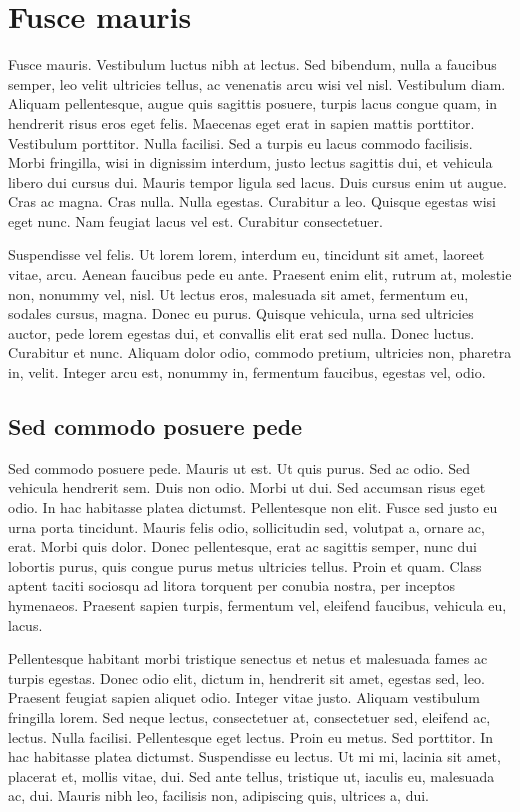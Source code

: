 \section{Fusce mauris}

Fusce mauris. Vestibulum luctus nibh at lectus. Sed bibendum, nulla a
faucibus semper, leo velit ultricies tellus, ac venenatis arcu wisi
vel nisl.  Vestibulum diam. Aliquam pellentesque, augue quis sagittis
posuere, turpis lacus congue quam, in hendrerit risus eros eget
felis. Maecenas eget erat in sapien mattis porttitor. Vestibulum
porttitor. Nulla facilisi.  Sed a turpis eu lacus commodo
facilisis. Morbi fringilla, wisi in dignissim interdum, justo lectus
sagittis dui, et vehicula libero dui cursus dui. Mauris tempor ligula
sed lacus. Duis cursus enim ut augue. Cras ac magna.  Cras
nulla. Nulla egestas. Curabitur a leo. Quisque egestas wisi eget
nunc. Nam feugiat lacus vel est. Curabitur consectetuer.

Suspendisse vel felis. Ut lorem lorem, interdum eu, tincidunt sit
amet, laoreet vitae, arcu. Aenean faucibus pede eu ante. Praesent enim
elit, rutrum at, molestie non, nonummy vel, nisl. Ut lectus eros,
malesuada sit amet, fermentum eu, sodales cursus, magna. Donec eu
purus. Quisque vehicula, urna sed ultricies auctor, pede lorem egestas
dui, et convallis elit erat sed nulla. Donec luctus. Curabitur et
nunc. Aliquam dolor odio, commodo pretium, ultricies non, pharetra in,
velit. Integer arcu est, nonummy in, fermentum faucibus, egestas vel,
odio.

\subsection{Sed commodo posuere pede}

Sed commodo posuere pede. Mauris ut est. Ut quis purus. Sed ac odio.
Sed vehicula hendrerit sem. Duis non odio. Morbi ut dui. Sed accumsan
risus eget odio. In hac habitasse platea dictumst. Pellentesque non
elit.  Fusce sed justo eu urna porta tincidunt. Mauris felis odio,
sollicitudin sed, volutpat a, ornare ac, erat. Morbi quis dolor. Donec
pellentesque, erat ac sagittis semper, nunc dui lobortis purus, quis
congue purus metus ultricies tellus. Proin et quam. Class aptent
taciti sociosqu ad litora torquent per conubia nostra, per inceptos
hymenaeos. Praesent sapien turpis, fermentum vel, eleifend faucibus,
vehicula eu, lacus.

Pellentesque habitant morbi tristique senectus et netus et malesuada
fames ac turpis egestas. Donec odio elit, dictum in, hendrerit sit
amet, egestas sed, leo. Praesent feugiat sapien aliquet odio. Integer
vitae justo.  Aliquam vestibulum fringilla lorem. Sed neque lectus,
consectetuer at, consectetuer sed, eleifend ac, lectus. Nulla
facilisi. Pellentesque eget lectus. Proin eu metus. Sed porttitor. In
hac habitasse platea dictumst. Suspendisse eu lectus. Ut mi mi,
lacinia sit amet, placerat et, mollis vitae, dui. Sed ante tellus,
tristique ut, iaculis eu, malesuada ac, dui. Mauris nibh leo,
facilisis non, adipiscing quis, ultrices a, dui.


